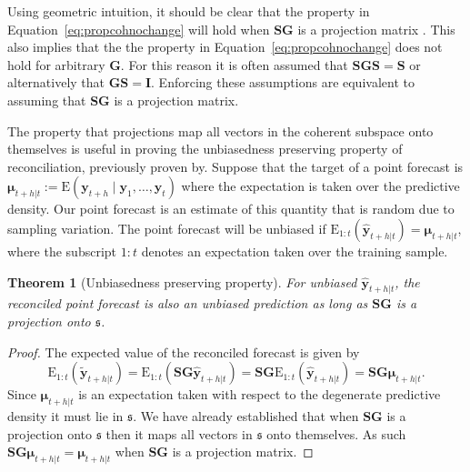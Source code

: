 \documentclass[12pt]{article}
\def\E{\text{E}}
\newtheorem{theo}{Theorem}[section]
\theoremstyle{definition}
\theoremstyle{property}
\begin{document}
	Using geometric intuition, it should be clear that the property in Equation~\ref{eq:propcohnochange} will hold when $\bm{SG}$ is a projection matrix .  This also implies that the the property in Equation~\ref{eq:propcohnochange} does not hold for arbitrary $\bm{G}$.  For this reason it is often assumed that $\bm{SGS}=\bm{S}$ or alternatively that $\bm{GS}=\bm{I}$.  Enforcing these assumptions are equivalent to assuming that  $\bm{SG}$ is a projection matrix.  
	
	The property that projections map all vectors in the coherent subspace onto themselves is useful in proving the unbiasedness preserving property of reconciliation, previously proven by.  Suppose that the target of a point forecast is $\bm{\mu}_{t+h|t}:=\E(\bm{y}_{t+h}\mid\bm{y}_{1},\dots,\bm{y}_{t})$ where the expectation is taken over the predictive density.  Our point forecast is an estimate of this quantity that is random due to sampling variation.  The point forecast will be unbiased if $\E_{1:t}(\hat{\bm{y}}_{t+h|t})=\bm{\mu}_{t+h|t}$, where the subscript $1:t$ denotes an expectation taken over the training sample.
	
	\begin{theo}[Unbiasedness preserving property]
		For unbiased $\hat{\bm{y}}_{t+h|t}$, the reconciled point forecast is also an unbiased prediction as long as $\bm{SG}$ is a projection onto $\mathfrak{s}$.
	\end{theo}
	\begin{proof}
		The expected value of the reconciled forecast is given by
		\[
		\E_{1:t}(\tilde{\bm{y}}_{t+h|t})
		= \E_{1:t}(\bm{S}\bm{G}\hat{\bm{y}}_{t+h|t})
		= \bm{S}\bm{G}\E_{1:t}(\hat{\bm{y}}_{t+h|t})
		= \bm{S}\bm{G}\bm{\mu}_{t+h|t}.
		\]
		Since $\bm{\mu}_{t+h|t}$ is an expectation taken with respect to the degenerate predictive density it must lie in $\mathfrak{s}$. We have already established that when $\bm{S}\bm{G}$ is a projection onto $\mathfrak{s}$ then it maps all vectors in $\mathfrak{s}$ onto themselves. As such $\bm{S}\bm{G}\bm{\mu}_{t+h|t}=\bm{\mu}_{t+h|t}$ when $\bm{S}\bm{G}$ is a projection matrix.
	\end{proof}
\end{document}
